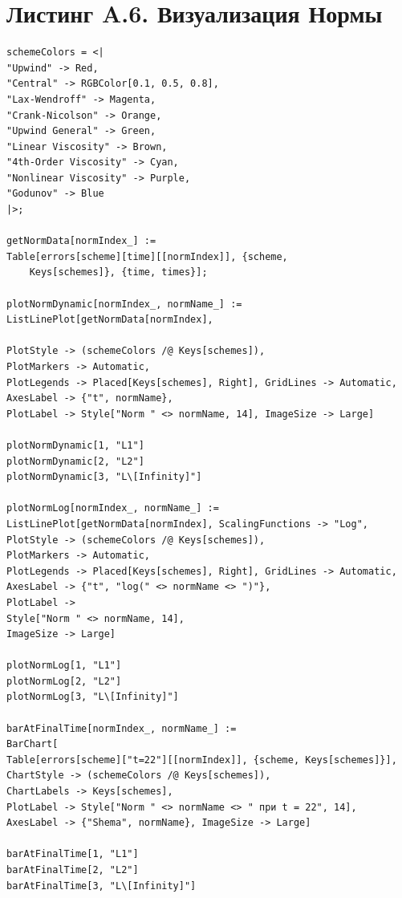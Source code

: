 \documentclass[a4paper,14pt]{extreport}
\begin{document}
\section*{Листинг A.6. Визуализация Нормы}
\begin{lstlisting}
schemeColors = <|
"Upwind" -> Red, 
"Central" -> RGBColor[0.1, 0.5, 0.8], 
"Lax-Wendroff" -> Magenta, 
"Crank-Nicolson" -> Orange, 
"Upwind General" -> Green, 
"Linear Viscosity" -> Brown, 
"4th-Order Viscosity" -> Cyan, 
"Nonlinear Viscosity" -> Purple, 
"Godunov" -> Blue
|>;

getNormData[normIndex_] := 
Table[errors[scheme][time][[normIndex]], {scheme, 
	Keys[schemes]}, {time, times}];
	
plotNormDynamic[normIndex_, normName_] := 
ListLinePlot[getNormData[normIndex], 

PlotStyle -> (schemeColors /@ Keys[schemes]), 
PlotMarkers -> Automatic, 
PlotLegends -> Placed[Keys[schemes], Right], GridLines -> Automatic,
AxesLabel -> {"t", normName}, 
PlotLabel -> Style["Norm " <> normName, 14], ImageSize -> Large]

plotNormDynamic[1, "L1"]
plotNormDynamic[2, "L2"]
plotNormDynamic[3, "L\[Infinity]"]

plotNormLog[normIndex_, normName_] := 
ListLinePlot[getNormData[normIndex], ScalingFunctions -> "Log", 
PlotStyle -> (schemeColors /@ Keys[schemes]), 
PlotMarkers -> Automatic, 
PlotLegends -> Placed[Keys[schemes], Right], GridLines -> Automatic,
AxesLabel -> {"t", "log(" <> normName <> ")"}, 
PlotLabel -> 
Style["Norm " <> normName, 14], 
ImageSize -> Large]

plotNormLog[1, "L1"]
plotNormLog[2, "L2"]
plotNormLog[3, "L\[Infinity]"]

barAtFinalTime[normIndex_, normName_] := 
BarChart[
Table[errors[scheme]["t=22"][[normIndex]], {scheme, Keys[schemes]}],
ChartStyle -> (schemeColors /@ Keys[schemes]), 
ChartLabels -> Keys[schemes], 
PlotLabel -> Style["Norm " <> normName <> " при t = 22", 14], 
AxesLabel -> {"Shema", normName}, ImageSize -> Large]

barAtFinalTime[1, "L1"]
barAtFinalTime[2, "L2"]
barAtFinalTime[3, "L\[Infinity]"]
\end{lstlisting}
\end{document}
